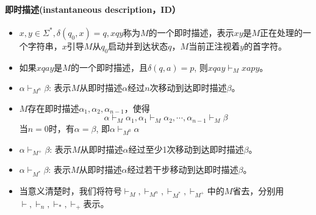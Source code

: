 \paragraph{\textbf{即时描述(instantaneous description，ID）}}

\begin{itemize}
	\item $x,y\in \Sigma^{\ast}, \delta(q_0,x)=q, xqy$称为$M$的一个即时描述，表示$xy$是$M$正在处理的一个字符串，$x$引导$M$从$q_0$启动并到达状态$q$，$M$当前正注视着$y$的首字符。 
	
	\item 如果$xqay$是$M$的一个即时描述，且$\delta(q,a)=p$, 则$xqay\vdash_Mxapy$。
	
	\item $\alpha\vdash_{M^n}\beta$: 表示$M$从即时描述$\alpha$经过$n$次移动到达即时描述$\beta$。
	
	\item $M$存在即时描述$\alpha_1,\alpha_2,\alpha_{n-1}$，使得
	\[\alpha\vdash_M\alpha_1,\alpha_1\vdash_M\alpha_2,\cdots,\alpha_{n-1}\vdash_M\beta\]
	\subitem 当$n=0$时，有$\alpha=\beta$, 即$\alpha\vdash_{M^0}\alpha$
	
	\item $\alpha\vdash_{M^+}\beta$: 表示$M$从即时描述$\alpha$经过至少1次移动到达即时描述$\beta$。
	
	\item $\alpha\vdash_{M^{\ast}}\beta$: 表示$M$从即时描述$\alpha$经过若干步移动到达即时描述$\beta$。
	
	\item 当意义清楚时，我们将符号$\vdash_M, \vdash_{M^n}, \vdash_{M^{\ast}}, \vdash_{M^+}$中的$M$省去，分别用$\vdash, \vdash_n, \vdash_\ast, \vdash_+$表示。	
\end{itemize}


